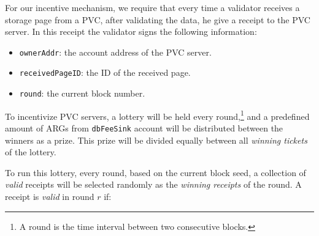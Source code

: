 For our incentive mechanism, we require that every time a validator receives a storage page from a PVC, after
validating the data, he give a receipt to the PVC server. In this receipt the validator signs the
following information:

\begin{itemize}
    \item \texttt{ownerAddr}: the account address of the PVC server.
    \item \texttt{receivedPageID}: the ID of the received page.
    \item \texttt{round}: the current block number.
\end{itemize}


To incentivize PVC servers, a lottery will be held every round,\footnote{A round is the time interval between
two consecutive blocks.} and a predefined amount of ARGs from
\texttt{dbFeeSink} account will be distributed between the winners as a prize. This prize will be divided equally
between all \emph{winning tickets} of the lottery.


To run this lottery, every round, based on the current block seed, a collection of \emph{valid} receipts will be
selected randomly as the \emph{winning receipts} of the round. A receipt is \emph{valid} in round $r$ if:


